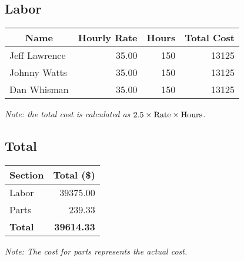 \subsection{Labor}
\begin{center}
\begin{tabular}{|l|r|r||r|}
\hline
\multicolumn{1}{|c}{Name} & \multicolumn{1}{|c}{Hourly Rate} & \multicolumn{1}{|c||}{Hours} & \multicolumn{1}{c|}{Total Cost}\\
\hline\hline
Jeff Lawrence & 35.00 & 150 & 13125 \\
\hline
Johnny Watts  & 35.00 & 150 & 13125 \\
\hline
Dan Whisman   & 35.00 & 150 & 13125 \\
\hline
\end{tabular}

{\it Note: the total cost is calculated as $2.5\times {\rm Rate} \times {\rm Hours}$.}
\end{center}

\subsection{Total}
\begin{center}
\begin{tabular}{|l|r|}
\hline
\multicolumn{1}{|c}{Section} & \multicolumn{1}{|c|}{Total (\$)} \\
\hline\hline
Labor       & 39375.00 \\
\hline
Parts       & 239.33   \\
\hline
{\bf Total} & {\bf 39614.33} \\
\hline
\end{tabular}

\emph{Note: The cost for parts represents the actual cost.}
\end{center}
